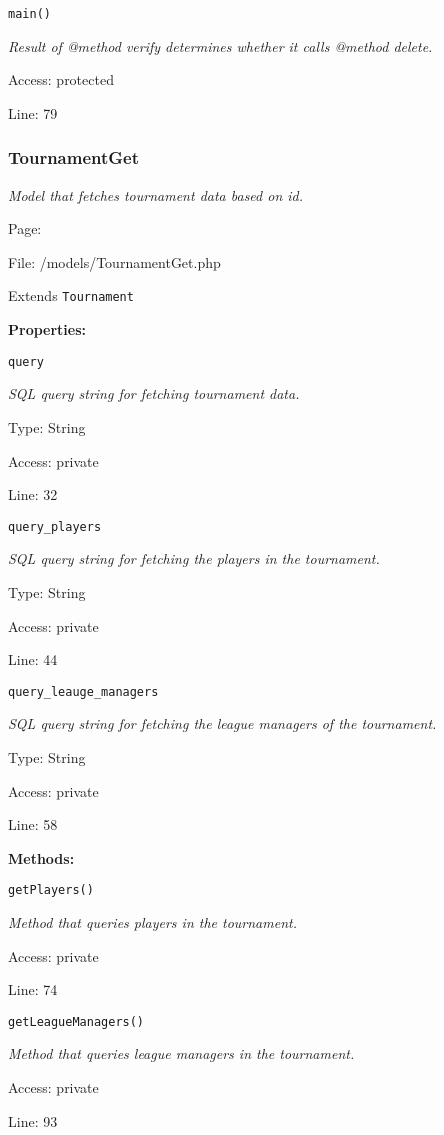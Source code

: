 \texttt{main()}

{\scriptsize
\textit{Result of @method verify determines whether it calls @method delete.}

Access: protected

Line: 79

}

\subsubsection{TournamentGet}\label{TournamentGet.php.doc}
\textit{Model that fetches tournament data based on id.}

Page: \pageref{TournamentGet.php}

File: /models/TournamentGet.php

Extends \texttt{Tournament}

\textbf{Properties:}

\texttt{query}

{\scriptsize
\textit{SQL query string for fetching tournament data.}

Type: String

Access: private

Line: 32

}
\texttt{query\_players}

{\scriptsize
\textit{SQL query string for fetching the players in the tournament.}

Type: String

Access: private

Line: 44

}
\texttt{query\_leauge\_managers}

{\scriptsize
\textit{SQL query string for fetching the league managers of the tournament.}

Type: String

Access: private

Line: 58

}
\textbf{Methods:}

\texttt{getPlayers()}

{\scriptsize
\textit{Method that queries players in the tournament.}

Access: private

Line: 74

}

\texttt{getLeagueManagers()}

{\scriptsize
\textit{Method that queries league managers in the tournament.}

Access: private

Line: 93

}

